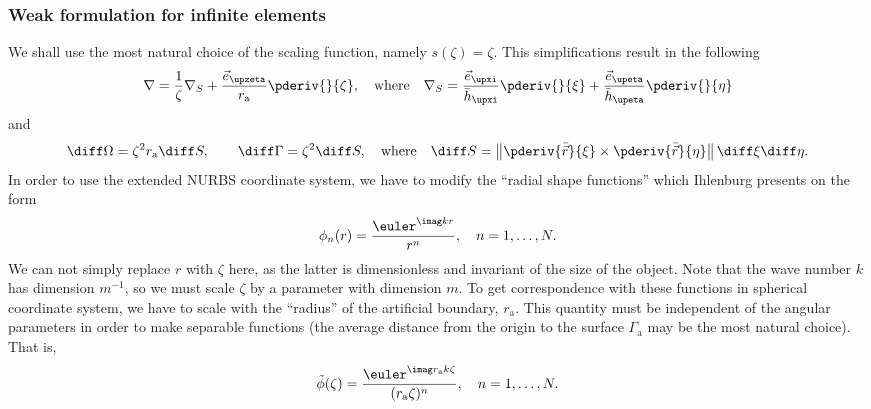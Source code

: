 \subsubsection{Weak formulation for infinite elements}
We shall use the most natural choice of the scaling function, namely $s(\zeta) = \zeta$. This simplifications result in the following
\begin{equation*}
	\nabla = \frac{1}{\zeta}\nabla_S + \frac{\vec{e}_{\upzeta}}{r_{\mathrm{a}}}\pderiv{}{\zeta}	,\quad\text{where}\quad\nabla_S = \frac{\vec{e}_{\upxi}}{\bar{h}_{\upxi}}\pderiv{}{\xi} + \frac{\vec{e}_{\upeta}}{\bar{h}_{\upeta}}\pderiv{}{\eta}
\end{equation*}
and
\begin{equation*}
	\diff\Omega = \zeta^2r_{\mathrm{a}}\diff S,\qquad \diff\Gamma = \zeta^2\diff S,\quad\text{where}\quad  \diff S = \left\|\pderiv{\bar{\vec{r}}}{\xi}\times\pderiv{\bar{\vec{r}}}{\eta} \right\|\diff\xi\diff\eta.	
\end{equation*}
In order to use the extended NURBS coordinate system, we have to modify the ``radial shape functions'' which Ihlenburg presents on the form
\begin{equation*}
	\phi_n(r) = \frac{\euler^{\imag k r}}{r^n},\quad n = 1,\dots,N.
\end{equation*}
We can not simply replace $r$ with $\zeta$ here, as the latter is dimensionless and invariant of the size of the object. Note that the wave number $k$ has dimension $\unit{m}^{-1}$, so we must scale $\zeta$ by a parameter with dimension $\unit{m}$. To get correspondence with these functions in spherical coordinate system, we have to scale with the ``radius'' of the artificial boundary, $r_{\mathrm{a}}$. This quantity must be independent of the angular parameters in order to make separable functions (the average distance from the origin to the surface $\Gamma_{\mathrm{a}}$ may be the most natural choice). That is,
\begin{equation}\label{Eq2:radialShapeFunctions}
	\tilde{\phi}(\zeta) = \frac{\euler^{\imag r_{\mathrm{a}} k \zeta}}{(r_{\mathrm{a}}\zeta )^n},\quad n = 1,\dots,N.	
\end{equation}

